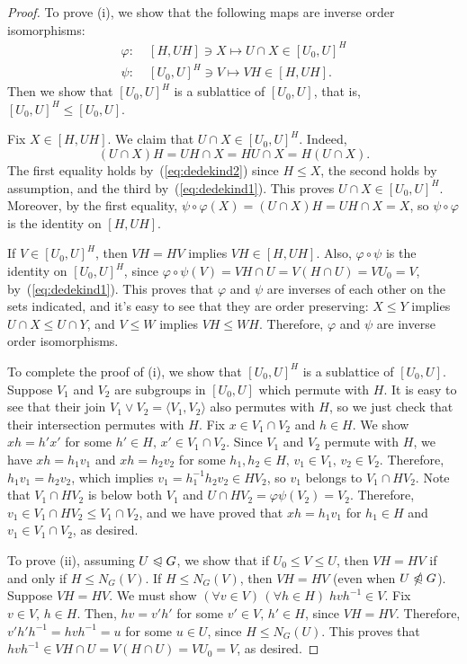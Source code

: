 \documentclass[cm,dissertation,actual,final]{uhthesis}
\theoremstyle{plain}
\theoremstyle{definition}
\newcounter{claim}
\theoremstyle{remark}
\numberwithin{theorem}{section}
\numberwithin{claim}{chapter}
\numberwithin{equation}{section}
\numberwithin{conjecture}{chapter}
\newcommand{\<}{\ensuremath{\langle}}
\renewcommand{\>}{\ensuremath{\rangle}}
\renewcommand{\leq}{\ensuremath{\leqslant}}
\newcommand{\subnormal}{\ensuremath{\trianglelefteqslant}}
\newcommand{\notsubnormal}{\ensuremath{\ntrianglelefteqslant}}
\newcommand{\join}{\ensuremath{\vee}}
\newcommand{\0}{\ensuremath{\mathbf{0}}}
\newcommand{\1}{\ensuremath{\mathbf{1}}}
\newcommand{\2}{\ensuremath{\mathbf{2}}}
\newcommand{\3}{\ensuremath{\mathbf{3}}}
\newcommand{\4}{\ensuremath{\mathbf{4}}}
\newcommand{\5}{\ensuremath{\mathbf{5}}}
\renewcommand{\phi}{\ensuremath{\varphi}}
\begin{document}
\begin{proof}
To prove (i), we show that the following maps are inverse order isomorphisms:
\begin{align}
\label{eq:inverse-isos}
\phi: \;& [H, UH] \ni X \mapsto U\cap X \in [U_0, U]^H\\
\psi: \;& [U_0, U]^H \ni V \mapsto VH \in [H, UH].\nonumber
\end{align}
Then we show that $[U_0, U]^H$ is a sublattice of $[U_0,U]$, that is, 
$[U_0, U]^H\leq [U_0,U]$.

Fix $X\in [H, UH]$. We claim that $U\cap X \in [U_0, U]^H$. Indeed,
\[
    (U\cap X) H = UH \cap X=
               HU \cap X
                = H(U \cap X).
\]
The first equality holds by~(\ref{eq:dedekind2}) since $H\leq X$, the second holds
by assumption, and the third by~(\ref{eq:dedekind1}).
  This proves $U\cap X \in [U_0, U]^H$.  Moreover, by the first equality,
$\psi \circ \phi (X) = (U\cap X)H =UH \cap X = X$,
so $\psi \circ \phi$ is the identity on $[H, UH]$.

If $V\in [U_0, U]^H$, then $VH = HV$ implies $VH \in [H, UH]$. Also, $\phi \circ
\psi$ is the identity on $[U_0, U]^H$, since $\phi \circ \psi(V)= VH \cap U =
V(H\cap U)= VU_0 = V$, by~(\ref{eq:dedekind1}). 
This proves that $\phi$ and $\psi$ are inverses of each other on the sets indicated, and
it's easy to see that they are order preserving:
$X\leq Y$ implies $U\cap X \leq U\cap Y$, and $V\leq W$ implies $VH \leq WH$.
Therefore, $\phi$ and $\psi$ are inverse order isomorphisms.

To complete the proof of (i), we show that
$[U_0, U]^H$ is a sublattice of $[U_0, U]$.  Suppose $V_1$ and $V_2$ are
subgroups in $[U_0, U]$ which permute with $H$.  
It is easy to see that their join $V_1 \join V_2 = \<V_1, V_2\>$ also permutes
with $H$, so we just check that their intersection permutes with $H$.  Fix
$x \in V_1 \cap V_2$ and $h\in H$.  We show $xh = h'x'$ for some $h'\in H, \, x'
\in V_1\cap V_2$. Since $V_1$ and $V_2$ permute with $H$, we have $xh = h_1 v_1$
and $xh = h_2 v_2$ for some $h_1, h_2\in H, \, v_1 \in V_1, \, v_2 \in V_2$.
Therefore, $h_1 v_1 = h_2 v_2$, which implies $v_1 = h_1^{-1}h_2 v_2 \in HV_2$,
so $v_1$ belongs to $V_1 \cap HV_2$. Note that $V_1 \cap HV_2$ is below both $V_1$ and
$U\cap HV_2 = \phi \psi(V_2) = V_2$.  Therefore, $v_1 \in V_1 \cap HV_2 \leq V_1
\cap V_2$, and we have proved that $xh = h_1 v_1$ for $h_1\in H$ and $v_1 \in
V_1\cap V_2$, as desired. 

To prove (ii), assuming $U\subnormal G$, we show that if $U_0 \leq V \leq U$,
then $VH = HV$ if and only if $H\leq N_G(V)$.
If $H\leq N_G(V)$, then $VH = HV$ (even when $U \notsubnormal G$).
Suppose $VH = HV$.  We must show $(\forall v\in V)\, (\forall h\in H)\; hvh^{-1}\in
V$.  Fix $v\in V, \, h\in H$.  Then, $hv = v'h'$ for some $v'\in V,\, h'\in H$, since
$VH = HV$.  Therefore, $v' h' h^{-1} = hvh^{-1} = u$ for some $u\in U$, since
$H\leq N_G(U)$. This proves that $hvh^{-1}\in VH\cap U = V(H\cap U) = VU_0 = V$, as
desired.
\end{proof}
\end{document}
